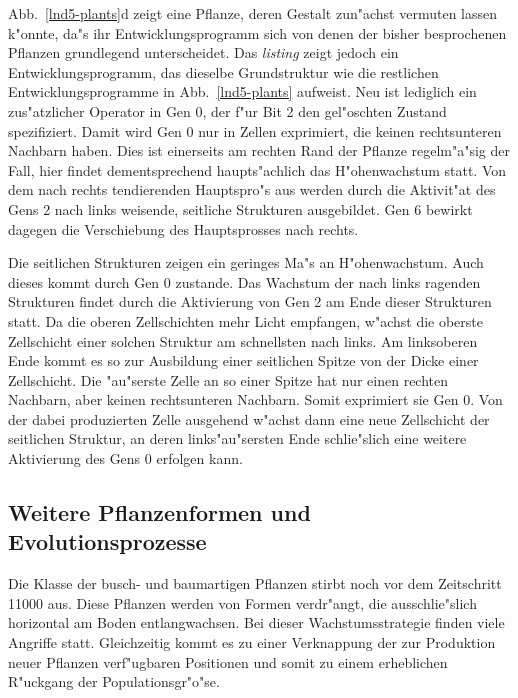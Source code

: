 Abb.\ \ref{lnd5-plants}d zeigt eine Pflanze, deren Gestalt zun"achst vermuten lassen k"onnte, da"s ihr Entwicklungsprogramm
sich von denen der bisher besprochenen Pflanzen grundlegend unterscheidet. Das \textsl{listing} zeigt jedoch ein
Entwicklungsprogramm, das dieselbe Grundstruktur wie die restlichen Entwicklungsprogramme in Abb.\ \ref{lnd5-plants} aufweist.
Neu ist lediglich ein zus"atzlicher Operator in Gen 0, der f"ur Bit 2 den gel"oschten Zustand spezifiziert. Damit wird
Gen 0 nur in Zellen exprimiert, die keinen rechtsunteren Nachbarn haben. Dies ist einerseits am rechten Rand
der Pflanze regelm"a"sig der Fall, hier findet dementsprechend haupts"achlich das H"ohenwachstum statt. Von dem nach rechts
tendierenden Hauptspro"s aus werden durch die Aktivit"at des Gens 2 nach links weisende, seitliche Strukturen ausgebildet.
Gen 6 bewirkt dagegen die Verschiebung des Hauptsprosses nach rechts.

Die seitlichen Strukturen zeigen ein geringes Ma"s an H"ohenwachstum. Auch dieses kommt durch Gen 0 zustande. Das Wachstum
der nach links ragenden Strukturen findet durch die Aktivierung von Gen 2 am Ende dieser Strukturen statt.
Da die oberen Zellschichten mehr Licht empfangen, w"achst die oberste Zellschicht einer solchen Struktur am schnellsten nach
links. Am linksoberen Ende kommt es so zur Ausbildung einer seitlichen Spitze von der Dicke einer Zellschicht. Die "au"serste
Zelle an so einer Spitze hat nur einen rechten Nachbarn, aber keinen rechtsunteren Nachbarn. Somit exprimiert sie Gen 0. Von
der dabei produzierten Zelle ausgehend w"achst dann eine neue Zellschicht der seitlichen Struktur, an deren links"au"sersten
Ende schlie"slich eine weitere Aktivierung des Gens 0 erfolgen kann.


\subsection{Weitere Pflanzenformen und Evolutionsprozesse}

Die Klasse der busch- und baumartigen Pflanzen stirbt noch vor dem Zeitschritt 11000 aus. Diese Pflanzen werden von Formen verdr"angt,
die ausschlie"slich horizontal am Boden entlangwachsen. Bei dieser Wachstumsstrategie finden viele Angriffe statt. Gleichzeitig kommt
es zu einer Verknappung der zur Produktion neuer Pflanzen verf"ugbaren Positionen und somit zu einem erheblichen R"uckgang
der Populationsgr"o"se.

